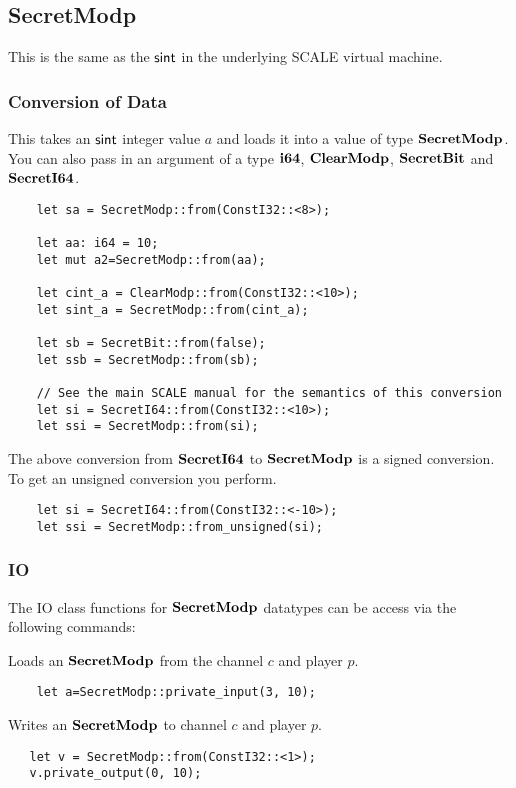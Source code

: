 \subsection{SecretModp}
This is the same as the $\mathsf{sint}$ in the underlying SCALE virtual machine.

\subsubsection{Conversion of Data}
This takes an $\mathsf{sint}$ integer value $a$ and loads it into a value
of type $\mathbf{SecretModp}$.
You can also pass in an argument of a type $\mathbf{i64}$, $\mathbf{ClearModp}$,
$\mathbf{SecretBit}$ and $\mathbf{SecretI64}$.
\begin{lstlisting}
    let sa = SecretModp::from(ConstI32::<8>);

    let aa: i64 = 10;
    let mut a2=SecretModp::from(aa);

    let cint_a = ClearModp::from(ConstI32::<10>);
    let sint_a = SecretModp::from(cint_a);

    let sb = SecretBit::from(false);
    let ssb = SecretModp::from(sb);

    // See the main SCALE manual for the semantics of this conversion
    let si = SecretI64::from(ConstI32::<10>);
    let ssi = SecretModp::from(si);
\end{lstlisting}

The above conversion from $\mathbf{SecretI64}$ to $\mathbf{SecretModp}$ is a signed conversion.
To get an unsigned conversion you perform.
\begin{lstlisting}
    let si = SecretI64::from(ConstI32::<-10>);
    let ssi = SecretModp::from_unsigned(si);
\end{lstlisting}

\subsubsection{IO}
The IO class functions for $\mathbf{SecretModp}$ datatypes can be access via the following commands:

Loads an $\mathbf{SecretModp}$ from the channel $c$ and player $p$.
\begin{lstlisting}
    let a=SecretModp::private_input(3, 10);
\end{lstlisting}

Writes an $\mathbf{SecretModp}$ to channel $c$ and player $p$.
\begin{lstlisting}
   let v = SecretModp::from(ConstI32::<1>);
   v.private_output(0, 10);
\end{lstlisting}

